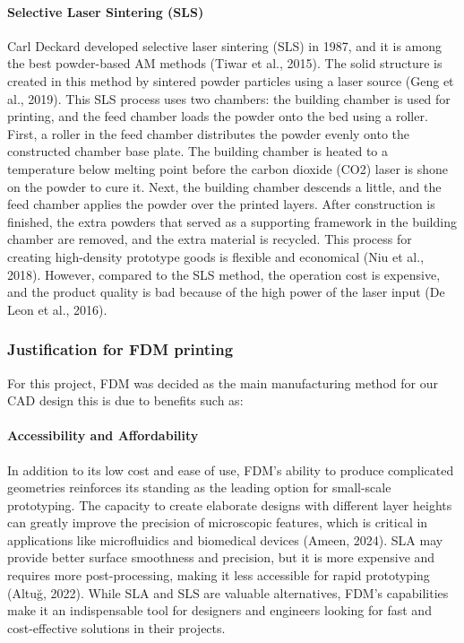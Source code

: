 \paragraph{Selective Laser Sintering (SLS)}
Carl Deckard developed selective laser sintering (SLS) in 1987, and it is among the best powder-based AM methods (Tiwar et al., 2015). 
The solid structure is created in this method by sintered powder particles using a laser source (Geng et al., 2019). 
This SLS process uses two chambers: the building chamber is used for printing, and the feed chamber loads the powder onto the bed using a roller. 
First, a roller in the feed chamber distributes the powder evenly onto the constructed chamber base plate. 
The building chamber is heated to a temperature below melting point before the carbon dioxide (CO2) laser is shone on the powder to cure it. 
Next, the building chamber descends a little, and the feed chamber applies the powder over the printed layers. 
After construction is finished, the extra powders that served as a supporting framework in the building chamber are removed, and the extra material is recycled. 
This process for creating high-density prototype goods is flexible and economical (Niu et al., 2018). 
However, compared to the SLS method, the operation cost is expensive, and the product quality is bad because of the high power of the laser input (De Leon et al., 2016).

\subsubsection{Justification for FDM printing}
For this project, FDM was decided as the main manufacturing method for our CAD design this is due to benefits such as: 

\paragraph{Accessibility and Affordability}

In addition to its low cost and ease of use, FDM's ability to produce complicated geometries reinforces its standing as the leading option for small-scale prototyping. 
The capacity to create elaborate designs with different layer heights can greatly improve the precision of microscopic features, which is critical in applications like microfluidics and biomedical devices (Ameen, 2024). 
SLA may provide better surface smoothness and precision, but it is more expensive and requires more post-processing, making it less accessible for rapid prototyping (Altuğ, 2022). 
While SLA and SLS are valuable alternatives, FDM's capabilities make it an indispensable tool for designers and engineers looking for fast and cost-effective solutions in their projects.

